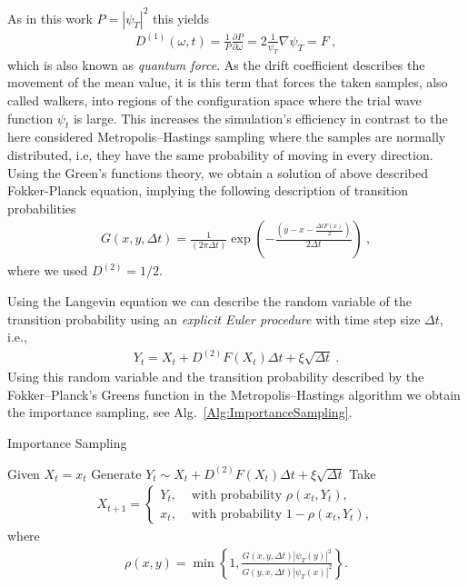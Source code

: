 \documentclass[11pt,a4paper]{article}
\numberwithin{equation}{section}
\begin{document}
As in this work $P = |\psi_T|^2$ this yields
\begin{align*}
D^{(1)}(\omega,t)
=
\frac{1}{P}\frac{\partial P}{\partial \omega}
=
2\frac{1}{\psi_T}\nabla\psi_T = F~,
\end{align*}
which is also known as {\it quantum force}.
%
As the drift coefficient describes the movement of the mean value, it is this term that forces the taken samples, also called walkers, into regions of the configuration space where the trial wave function $\psi_t$ is large.
%
This increases the simulation's efficiency in contrast to the here considered Metropolis--Hastings sampling where the samples are normally distributed, i.e, they have the same probability of moving in every direction.
%
Using the Green's functions theory, we obtain a solution of above described Fokker-Planck equation, implying the following description of transition probabilities 
\begin{align*}
G(x,y,\Delta t)
=
\frac{1}{(2\pi \Delta t)}\exp\left( -\frac{(y-x-\frac{\Delta t F(x)}{2})}{2\Delta t}\right)~,
\end{align*}
where we used $D^{(2)}=1/2$.

%
Using the Langevin equation we can describe the random variable of the transition probability using an {\it explicit Euler procedure} with time step size $\Delta t$, i.e.,
\begin{align*}
Y_t = X_t + D^{(2)}F(X_t) \Delta t+ \xi \sqrt{\Delta t}~.
\end{align*}
Using this random variable and the transition probability described by the Fokker--Planck's Greens function in the Metropolis--Hastings algorithm we obtain the importance sampling, see Alg.~\ref{Alg:ImportanceSampling}.

\begin{algorithm}
	\caption{Importance Sampling}
	\label{Alg:ImportanceSampling}
	\begin{algorithmic}[1]
		\State Given $X_t = x_t$
		\State Generate $Y_t\sim X_t + D^{(2)}F(X_t) \Delta t+ \xi \sqrt{\Delta t}$
		\State Take 
		\begin{align*}
		X_{t+1}=\left\lbrace 
		\begin{aligned}
		Y_t, &\text{ with probability } \rho(x_t,Y_t),\\
		x_t, &\text{ with probability } 1- \rho(x_t,Y_t),
		\end{aligned}
		\right.
		\end{align*}
		where 
		\begin{align*}
		\rho(x,y) = \min\left\lbrace 1, \frac{G(x,y,\Delta t)|\psi_T(y)|^2}{G(y,x,\Delta t)|\psi_T(x)|^2}\right\rbrace.
		\end{align*}
		\EndProcedure
	\end{algorithmic}
\end{algorithm}
\end{document}
